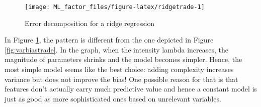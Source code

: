 \documentclass[]{krantz}
\makeatletter
\newenvironment{Shaded}{\begin{snugshade}}{\end{snugshade}}
\newcommand{\CommentTok}[1]{\textcolor[rgb]{0.37,0.37,0.37}{\textit{#1}}}
\newcommand{\DataTypeTok}[1]{\textcolor[rgb]{0.27,0.27,0.27}{#1}}
\newcommand{\DecValTok}[1]{\textcolor[rgb]{0.06,0.06,0.06}{#1}}
\newcommand{\KeywordTok}[1]{\textcolor[rgb]{0.27,0.27,0.27}{\textbf{#1}}}
\newcommand{\NormalTok}[1]{#1}
\newcommand{\OperatorTok}[1]{\textcolor[rgb]{0.43,0.43,0.43}{\textbf{#1}}}
\newcommand{\OtherTok}[1]{\textcolor[rgb]{0.37,0.37,0.37}{#1}}
\newcommand{\StringTok}[1]{\textcolor[rgb]{0.5,0.5,0.5}{#1}}
\newenvironment{kframe}{%
\medskip{}
\setlength{\fboxsep}{.8em}
 \def\at@end@of@kframe{}%
 \ifinner\ifhmode%
  \def\at@end@of@kframe{\end{minipage}}%
  \begin{minipage}{\columnwidth}%
 \fi\fi%
 \def\FrameCommand##1{\hskip\@totalleftmargin \hskip-\fboxsep
 \colorbox{shadecolor}{##1}\hskip-\fboxsep
     \hskip-\linewidth \hskip-\@totalleftmargin \hskip\columnwidth}%
 \MakeFramed {\advance\hsize-\width
   \@totalleftmargin\z@ \linewidth\hsize
   \@setminipage}}%
 {\par\unskip\endMakeFramed%
 \at@end@of@kframe}
\renewenvironment{Shaded}{\begin{kframe}}{\end{kframe}}
\theoremstyle{definition}
\theoremstyle{definition}
\theoremstyle{definition}
\theoremstyle{remark}
\makeatother
\begin{document}
\begin{Shaded}
\end{Shaded}

\begin{figure}[H]

{\centering \texttt{[image: ML\_factor\_files/figure-latex/ridgetrade-1]} 

}

\caption{Error decomposition for a ridge regression}\label{fig:ridgetrade}
\end{figure}

\normalsize

In Figure \ref{fig:ridgetrade}, the pattern is different from the one
depicted in Figure \ref{fig:varbiastrade}. In the graph, when the
intensity lambda increases, the magnitude of parameters shrinks and the
model becomes simpler. Hence, the most simple model seems like the best
choice: adding complexity increases variance but does not improve the
bias! One possible reason for that is that features don't actually carry
much predictive value and hence a constant model is just as good as more
sophisticated ones based on unrelevant variables.
\end{document}
